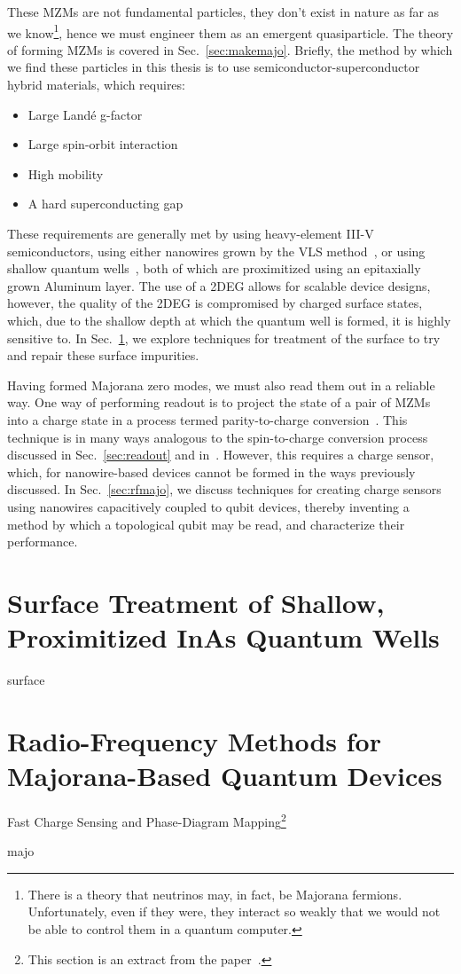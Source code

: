 These MZMs are not fundamental particles, they don't exist in nature as far as we know\footnote{There is a theory that neutrinos may, in
fact, be Majorana fermions. Unfortunately, even if they were, they interact so weakly that we would not be able to control them in a quantum computer.},
hence we must engineer them as an emergent quasiparticle. The theory of forming MZMs is covered in Sec.~\ref{sec:makemajo}. Briefly, the method by
which we find these particles in this thesis is to use semiconductor-superconductor hybrid materials, which requires:
\begin{itemize}
    \item Large Land\'e g-factor
    \item Large spin-orbit interaction
    \item High mobility
    \item A hard superconducting gap
\end{itemize}
These requirements are generally met by using heavy-element III-V semiconductors, using either nanowires grown by the VLS method~\cite{nnano.2014.306,Krogstrup},
or using shallow quantum wells~\cite{PhysRevB.93.155402}, both of which are proximitized using an epitaxially grown Aluminum layer. The use of a 2DEG allows
for scalable device designs, however, the quality of the 2DEG is compromised by charged surface states, which, due to the shallow depth at which the quantum
well is formed, it is highly sensitive to. In Sec.~\ref{sec:inas_hb}, we explore techniques for treatment of the surface to try and repair these surface impurities.

Having formed Majorana zero modes, we must also read them out in a reliable way. One way of performing readout is to project the state of a pair of MZMs into
a charge state in a process termed parity-to-charge conversion~\cite{AasenPRX16}. This technique is in many ways analogous to the spin-to-charge conversion
process discussed in Sec.~\ref{sec:readout} and in~\cite{petta,RevModPhys.79.1217}. However, this requires a charge sensor, which, for nanowire-based devices cannot
be formed in the ways previously discussed. In Sec.~\ref{sec:rfmajo}, we discuss techniques for creating charge sensors using nanowires capacitively coupled
to qubit devices, thereby inventing a method by which a topological qubit may be read, and characterize their performance.

\clearpage
\section{Surface Treatment of Shallow, Proximitized InAs Quantum Wells}
\label{sec:inas_hb}
{surface}

\clearpage
\section{Radio-Frequency Methods for {Majorana-Based} {Quantum} {Devices}}
{\large \bf \begin{center}Fast Charge Sensing and Phase-Diagram Mapping\footnote{
    This section is an extract from the paper~\cite{PhysRevApplied.11.064011}.
}\end{center}}
\label{sec:rfmajo}
{majo}

